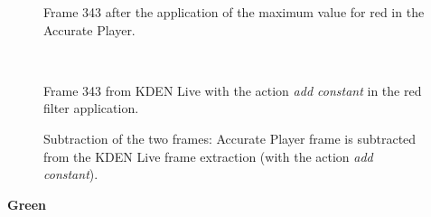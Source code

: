 \documentclass[../MasterThesis.tex]{subfiles}
\begin{document}
\begin{minipage}{0.48\textwidth}
	\begin{figure}[H]
		\begin{center}
			\caption[]{\small Frame 343 after the application of the maximum value for red in the Accurate Player.}
		\end{center}
	\end{figure}
\end{minipage}\begin{minipage}{0.04\textwidth}
	\ 
\end{minipage}\begin{minipage}{0.48\textwidth}
	\begin{figure}[H]
		\begin{center}
			\caption[]{\small Frame 343 from KDEN Live with the action \textit{add constant} in the red filter application.}
		\end{center}
	\end{figure}
\end{minipage}

\vspace*{-1em}

\begin{figure}[H]
	\begin{center}
		\caption[]{\small Subtraction of the two frames: Accurate Player frame is subtracted from the KDEN Live frame extraction (with the action \textit{add constant}).}
	\end{center}
\end{figure}





\vspace*{-1em}
\textbf{Green}

\vspace*{-1em}
\end{document}

